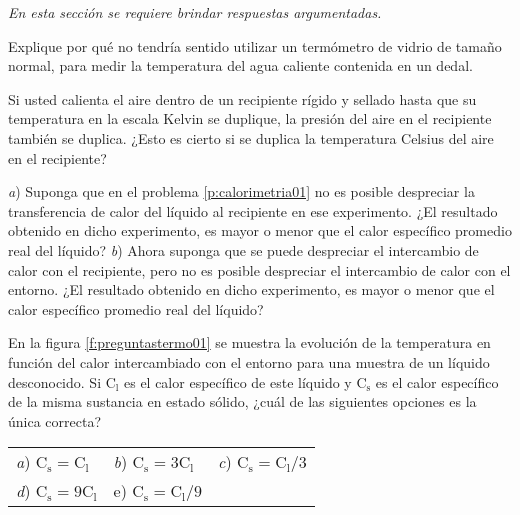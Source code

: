 \textit{En esta sección se requiere brindar respuestas argumentadas.}
\setcounter{figure}{0}
%
\begin{Exercise}
  Explique por qué no tendría sentido utilizar un termómetro de vidrio de tamaño normal, para medir la temperatura del agua caliente contenida en un dedal.
\end{Exercise}
%
\begin{Exercise}
  Si usted calienta el aire dentro de un recipiente rígido y sellado hasta que su temperatura en la escala Kelvin se duplique, la presión del aire en el recipiente también se duplica. ¿Esto es cierto si se duplica la temperatura Celsius del aire en el recipiente?
\end{Exercise}
%
\begin{Exercise}
  \textit{a}) Suponga que en el problema \ref{p:calorimetria01} no es posible despreciar la transferencia de calor del líquido al recipiente en ese experimento. ¿El resultado obtenido en dicho experimento, es mayor o menor que el calor específico promedio real del líquido? \textit{b}) Ahora suponga que se puede despreciar el intercambio de calor con el recipiente, pero no es posible despreciar el intercambio de calor con el entorno. ¿El resultado obtenido en dicho experimento, es mayor o menor que el calor específico promedio real del líquido?
\end{Exercise}
%
\begin{Exercise}\label{p:preguntastermo01}
  En la figura \ref{f:preguntastermo01} se muestra la evolución de la temperatura en función del calor intercambiado con el entorno para una muestra de un líquido desconocido. Si $\text{C}_{\text{l}}$ es el calor específico de este líquido y $\text{C}_{\text{s}}$ es el calor específico de la misma sustancia en estado sólido, ¿cuál de las siguientes opciones es la única correcta?\\
\renewcommand{\arraystretch}{1.5}
  \begin{tabular}{p{2.5cm} p{2.5cm} p{2.5cm}}
     \textit{a}) $\text{C}_{\text{s}}=\text{C}_{\text{l}}$ & \textit{b}) $\text{C}_{\text{s}}=3\text{C}_{\text{l}}$ & \textit{c}) $\text{C}_{\text{s}}=\text{C}_{\text{l}}/3$ \\
     \textit{d}) $\text{C}_{\text{s}}=9\text{C}_{\text{l}}$ & e) $\text{C}_{\text{s}}=\text{C}_{\text{l}}/9$ \\
  \end{tabular} \\
\end{Exercise}
